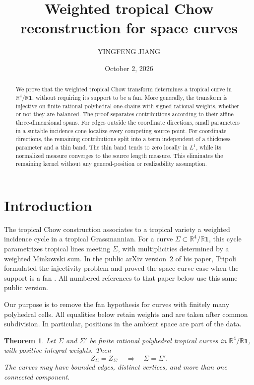 \documentclass[11pt]{article}
\title{Weighted tropical Chow reconstruction for space curves}
\author{YINGFENG JIANG}
\date{October 2, 2026}
\newtheorem{theorem}{Theorem}[section]
\theoremstyle{definition}
\theoremstyle{remark}
\newcommand{\R}{\mathbb R}
\newcommand{\one}{\mathbf 1}
\begin{document}
\maketitle

\begin{abstract}
We prove that the weighted tropical Chow transform determines a tropical
curve in $\R^4/\R\one$, without requiring its support to be a fan.
More generally, the transform is injective on finite rational polyhedral
one-chains with signed rational weights, whether or not they are balanced.
The proof separates contributions according to their affine
three-dimensional spans. For edges outside the coordinate directions,
small parameters in a suitable incidence cone localize every competing
source point. For coordinate directions, the remaining contributions
split into a term independent of a thickness parameter and a thin band.
The thin band tends to zero locally in $L^1$, while its normalized measure
converges to the source length measure. This eliminates the remaining
kernel without any general-position or realizability assumption.
\end{abstract}

\section{Introduction}

The tropical Chow construction associates to a tropical variety a weighted
incidence cycle in a tropical Grassmannian. For a curve
$\Sigma\subset\R^4/\R\one$, this cycle parametrizes tropical lines meeting
$\Sigma$, with multiplicities determined by a weighted Minkowski sum.
In the public arXiv version~2 of his paper, Tripoli formulated the
injectivity problem and proved the space-curve case when the support is
a fan \cite[Conjecture~3.4 and Theorem~3.9]{Tripoli}.
All numbered references to that paper below use this same public version.

Our purpose is to remove the fan hypothesis for curves with finitely many
polyhedral cells. All equalities below retain weights and are taken after
common subdivision. In particular, positions in the ambient space are
part of the data.

\begin{theorem}\label{thm:curves}
Let $\Sigma$ and $\Sigma'$ be finite rational polyhedral tropical curves
in $\R^4/\R\one$, with positive integral weights. Then
\[
 Z_\Sigma=Z_{\Sigma'}\quad\Longrightarrow\quad\Sigma=\Sigma'.
\]
The curves may have bounded edges, distinct vertices, and more than one
connected component.
\end{theorem}
\end{document}
